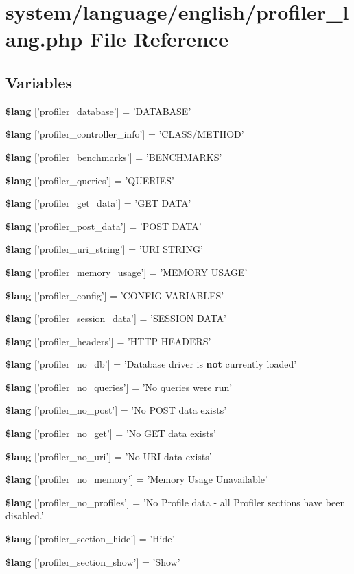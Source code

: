 \section{system/language/english/profiler\-\_\-lang.php File Reference}
\label{profiler__lang_8php}
\subsection*{Variables}
\begin{DoxyCompactItemize}
\item 
{\bf \$lang} ['profiler\-\_\-database'] = 'D\-A\-T\-A\-B\-A\-S\-E'
\item 
{\bf \$lang} ['profiler\-\_\-controller\-\_\-info'] = 'C\-L\-A\-S\-S/M\-E\-T\-H\-O\-D'
\item 
{\bf \$lang} ['profiler\-\_\-benchmarks'] = 'B\-E\-N\-C\-H\-M\-A\-R\-K\-S'
\item 
{\bf \$lang} ['profiler\-\_\-queries'] = 'Q\-U\-E\-R\-I\-E\-S'
\item 
{\bf \$lang} ['profiler\-\_\-get\-\_\-data'] = 'G\-E\-T D\-A\-T\-A'
\item 
{\bf \$lang} ['profiler\-\_\-post\-\_\-data'] = 'P\-O\-S\-T D\-A\-T\-A'
\item 
{\bf \$lang} ['profiler\-\_\-uri\-\_\-string'] = 'U\-R\-I S\-T\-R\-I\-N\-G'
\item 
{\bf \$lang} ['profiler\-\_\-memory\-\_\-usage'] = 'M\-E\-M\-O\-R\-Y U\-S\-A\-G\-E'
\item 
{\bf \$lang} ['profiler\-\_\-config'] = 'C\-O\-N\-F\-I\-G V\-A\-R\-I\-A\-B\-L\-E\-S'
\item 
{\bf \$lang} ['profiler\-\_\-session\-\_\-data'] = 'S\-E\-S\-S\-I\-O\-N D\-A\-T\-A'
\item 
{\bf \$lang} ['profiler\-\_\-headers'] = 'H\-T\-T\-P H\-E\-A\-D\-E\-R\-S'
\item 
{\bf \$lang} ['profiler\-\_\-no\-\_\-db'] = 'Database driver is {\bf not} currently loaded'
\item 
{\bf \$lang} ['profiler\-\_\-no\-\_\-queries'] = 'No queries were run'
\item 
{\bf \$lang} ['profiler\-\_\-no\-\_\-post'] = 'No P\-O\-S\-T data exists'
\item 
{\bf \$lang} ['profiler\-\_\-no\-\_\-get'] = 'No G\-E\-T data exists'
\item 
{\bf \$lang} ['profiler\-\_\-no\-\_\-uri'] = 'No U\-R\-I data exists'
\item 
{\bf \$lang} ['profiler\-\_\-no\-\_\-memory'] = 'Memory Usage Unavailable'
\item 
{\bf \$lang} ['profiler\-\_\-no\-\_\-profiles'] = 'No Profile data -\/ all Profiler sections have been disabled.'
\item 
{\bf \$lang} ['profiler\-\_\-section\-\_\-hide'] = 'Hide'
\item 
{\bf \$lang} ['profiler\-\_\-section\-\_\-show'] = 'Show'
\end{DoxyCompactItemize}



